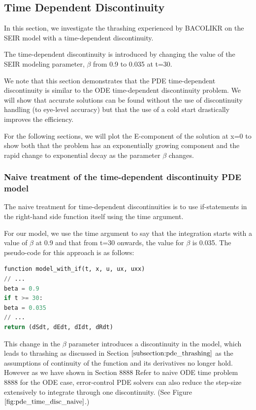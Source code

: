 \documentclass{article}
\begin{document}
\subsection{Time Dependent Discontinuity}
\label{subsection:pde_time_intro}
In this section, we investigate the thrashing experienced by BACOLIKR on the SEIR model with a time-dependent discontinuity. 

The time-dependent discontinuity is introduced by changing the value of the SEIR modeling parameter, $\beta$ from 0.9 to 0.035 at t=30.

We note that this section demonstrates that the PDE time-dependent discontinuity is similar to the ODE time-dependent discontinuity problem. We will show that accurate solutions can be found without the use of discontinuity handling (to eye-level accuracy) but that the use of a cold start drastically improves the efficiency.

For the following sections, we will plot the E-component of the solution at x=0 to show both that the problem has an exponentially growing component and the rapid change to exponential decay as the parameter $\beta$ changes.

\subsubsection{Naive treatment of the time-dependent discontinuity PDE model}
\label{subsubsection:pde_time_naive}
The naive treatment for time-dependent discontinuities is to use if-statements in the right-hand side function itself using the time argument.

For our model, we use the time argument to say that the integration starts with a value of $\beta$ at 0.9 and that from t=30 onwards, the value for $\beta$ is 0.035. The pseudo-code for this approach is as follows:

\begin{minipage}{\linewidth}
\begin{lstlisting}[language=Python]
function model_with_if(t, x, u, ux, uxx)
// ...
beta = 0.9
if t >= 30:
beta = 0.035
// ...
return (dSdt, dEdt, dIdt, dRdt)

\end{lstlisting}
\end{minipage}

This change in the $\beta$ parameter introduces a discontinuity in the model, which leads to thrashing as discussed in Section $\ref{subsection:pde_thrashing}$ as the assumptions of continuity of the function and its derivatives no longer hold. However as we have shown in Section 8888 Refer to naive ODE time problem 8888 for the ODE case, error-control PDE solvers can also reduce the step-size extensively to integrate through one discontinuity. (See Figure $\ref{fig:pde_time_disc_naive}$.)
\end{document}
